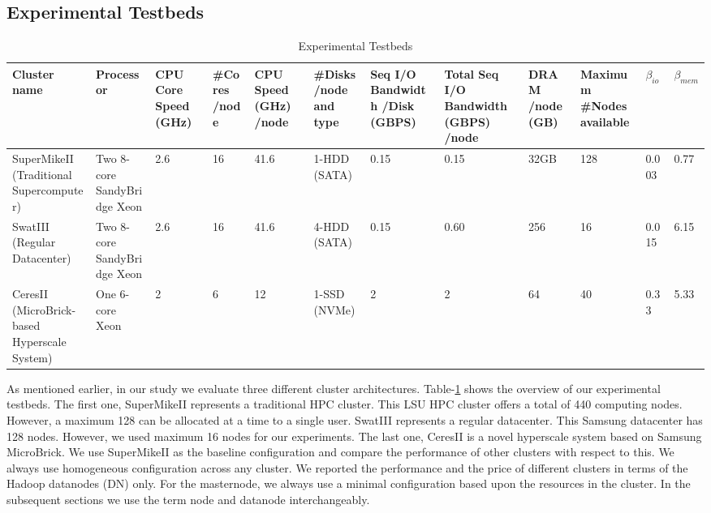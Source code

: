 \documentclass[journal]{IEEEtran}
\begin{document}
\subsection{Experimental Testbeds}
\begin{table}[!t]
\caption{Experimental Testbeds}
\label{tab:Testbeds}
\centering
\begin{tabular}{|p{1.8cm}|p{2cm}|p{1cm}|p{1cm}|p{1cm}|p{1cm}|p{1cm}|p{1cm}|p{1cm}|p{1cm}|p{0.6cm}|p{0.6cm}|}
\hline
Cluster name & Processor & CPU Core Speed (GHz) & \#Cores /node & CPU Speed (GHz) /node & \#Disks /node and type & Seq I/O Bandwidth /Disk (GBPS) & Total Seq I/O Bandwidth (GBPS) /node & DRAM /node (GB) & Maximum \#Nodes available & $\beta_{io}$ & $\beta_{mem}$\\
\hline
SuperMikeII (Traditional Supercomputer) & Two 8-core SandyBridge Xeon & 2.6 & 16 & 41.6 & 1-HDD (SATA) & 0.15 & 0.15 & 32GB & 128 & 0.003 & 0.77\\
\hline
SwatIII (Regular Datacenter) & Two 8-core SandyBridge Xeon & 2.6 &  16 & 41.6 & 4-HDD (SATA) & 0.15 & 0.60 & 256 & 16 & 0.015 & 6.15\\
\hline
CeresII (MicroBrick-based Hyperscale System) & One 6-core Xeon & 2 & 6 & 12 & 1-SSD (NVMe) & 2 & 2 & 64 & 40 & 0.33 & 5.33\\
\hline
\end{tabular}
\end{table}
As mentioned earlier, in our study we evaluate three different cluster architectures. Table-\ref{tab:Testbeds} shows the overview of our experimental testbeds. The first one, SuperMikeII represents a traditional HPC cluster. This LSU HPC cluster oﬀers a total of 440 computing nodes. However, a maximum 128 can be allocated at a time to a single user. SwatIII represents a regular datacenter. This Samsung datacenter has 128 nodes. However, we used maximum 16 nodes for our experiments. The last one, CeresII is a novel hyperscale system based on Samsung MicroBrick. We use SuperMikeII as the baseline conﬁguration and compare the performance of other clusters with respect to this. We always use homogeneous conﬁguration across any cluster. We reported the performance and the price of diﬀerent clusters in terms of the Hadoop datanodes (DN) only. For the masternode, we always use a minimal configuration based upon the resources in the cluster. In the subsequent sections we use the term node and datanode interchangeably.
\end{document}
